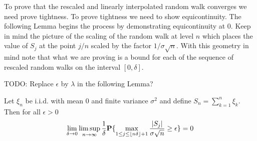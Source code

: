 To prove that the rescaled and linearly interpolated random walk converges we need
prove tightness.  To prove tightness we need to show equicontinuity.
The following Lemma begins the process by demonstrating equicontinuity
at $0$.  Keep in mind the picture of the scaling of the random walk at
level $n$
which places the value of $S_j$ at the point $j/n$ scaled by the
factor $1/\sigma\sqrt{n}$.  With this geometry in mind note that what
we are proving is a bound for each of the sequence of rescaled random
walks on the interval $[0,\delta]$.

TODO: Replace $\epsilon$ by $\lambda$ in the following Lemma?
\begin{lem}\label{RandomWalkEquicontinuityAt0} Let $\xi_n$ be i.i.d. with mean $0$ and finite variance
  $\sigma^2$ and define $S_n = \sum_{k=1}^n \xi_k$.  Then for all
  $\epsilon > 0$ 
\begin{align*}
\lim_{\delta \to 0} \limsup_{n \to \infty} \frac{1}{\delta}
\textbf{P}\{\max_{1 \leq j \leq \lfloor n\delta \rfloor+1} \frac{\left \vert S_j \right \vert}{\sigma\sqrt{n}} \geq
  \epsilon\} = 0
\end{align*}
\end{lem}
